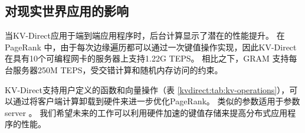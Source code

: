 \subsection{对现实世界应用的影响}

当KV-Direct应用于端到端应用程序时，后台计算显示了潜在的性能提升。 在PageRank \cite {page1999pagerank}中，由于每次边缘遍历都可以通过一次键值操作实现，因此KV-Direct在具有10个可编程网卡的服务器上支持1.22G TEPS。 相比之下，GRAM \cite {wu2015g}支持每台服务器250M TEPS，受交错计算和随机内存访问的约束。

KV-Direct支持用户定义的函数和向量操作（表 \ref {kvdirect:tab:kv-operations}），可以通过将客户端计算卸载到硬件来进一步优化PageRank。 类似的参数适用于参数server \cite {li2014scaling}。 我们希望未来的工作可以利用硬件加速的键值存储来提高分布式应用程序的性能。

